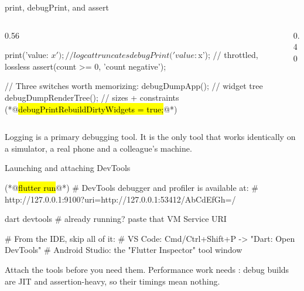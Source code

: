 \documentclass[10pt,aspectratio=169,t]{beamer}
\begin{document}
\begin{frame}[fragile,eyebrow=Debugging]{print, debugPrint, and assert}
  \begin{columns}[T]
    \begin{column}{0.56\textwidth}
\begin{dart}
print('value: $x');       // logcat truncates
debugPrint('value: $x');  // throttled, lossless
assert(count >= 0, 'count negative');

// Three switches worth memorizing:
debugDumpApp();            // widget tree
debugDumpRenderTree();     // sizes + constraints
(*@\hl{debugPrintRebuildDirtyWidgets = true;}@*)
\end{dart}
    \end{column}
    \begin{column}{0.40\textwidth}
    \end{column}
  \end{columns}
  \begin{takeaway}{Logging is a primary debugging tool.}
    It is the only tool that works identically on a simulator, a real phone and a colleague's machine.
  \end{takeaway}
\end{frame}

\begin{frame}[fragile,eyebrow=Debugging]{Launching and attaching DevTools}
\begin{shell}
(*@\hl{flutter run}@*)
#   DevTools debugger and profiler is available at:
#   http://127.0.0.1:9100?uri=http://127.0.0.1:53412/AbCdEfGh=/

dart devtools   # already running? paste that VM Service URI

# From the IDE, skip all of it:
#   VS Code:        Cmd/Ctrl+Shift+P -> "Dart: Open DevTools"
#   Android Studio: the "Flutter Inspector" tool window
\end{shell}
  \begin{takeaway}{Attach the tools before you need them.}
    Performance work needs : debug builds are JIT and assertion-heavy, so their timings mean nothing.
  \end{takeaway}
\end{frame}
\end{document}
